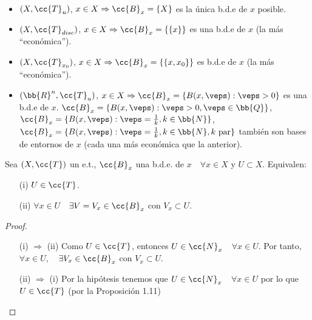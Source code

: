 \begin{ejemplo}\
    \begin{itemize}
        \item $(X, \cc{T}_u)$, $x\in X\Rightarrow \cc{B}_x=\{X\}$ es la única b.d.e de $x$ posible.
        \item $(X, \cc{T}_{disc})$, $x \in X \Rightarrow \cc{B}_x=\{\{x\}\}$ es una b.d.e de $x$ (la más ``económica'').
        \item $(X, \cc{T}_{x_0})$, $x \in X \Rightarrow \cc{B}_x = \{\{x,x_0\}\}$ es b.d.e de $x$ (la más ``económica'').
        \item $(\bb{R}^n, \cc{T}_u)$, $x \in X\Rightarrow \cc{B}_x = \{B(x, \veps): \veps > 0\}$ es una b.d.e de $x$. $\cc{B}_x = \{B(x, \veps):\veps > 0 , \veps \in \bb{Q}\}$, $\cc{B}_x = \{B(x, \veps):\veps =\frac{1}{k}, k\in \bb{N}\}$, $\cc{B}_x = \{B(x, \veps):\veps =\frac{1}{k}, k\in \bb{N}, k\text{ par}\}$ también son bases de entornos de $x$ (cada una más económica que la anterior).
    \end{itemize}
    \endsquare
\end{ejemplo}

\begin{prop}
    Sea $(X,\cc{T})$ un e.t., $\cc{B}_x$ una b.d.e. de $x$\ \ $\forall x \in X$ y $U\subset X$. Equivalen:
    \begin{enumerate}
        \item[(i)] $U\in \cc{T}$.
        \item[(ii)] $\forall x \in U$\ \ $\exists V = V_x\in \cc{B}_x$ con $V_x\subset U$. 
    \end{enumerate}

    \begin{proof}\ 
        \begin{itemize}
            \item[(i) $\Rightarrow$ (ii)] Como $U\in \cc{T}$, entonces $U\in \cc{N}_x$\ \ $\forall x \in U$. Por tanto, $\forall x \in U,$\ \ $\exists V_x\in \cc{B}_x$ con $V_x\subset U$.
            \item[(ii) $\Rightarrow$ (i)] Por la hipótesis tenemos que $U\in \cc{N}_x$\ \ $\forall x \in U$ por lo que $U\in \cc{T}$ (por la Proposición 1.11) %
        \end{itemize}
    \end{proof}
\end{prop}

